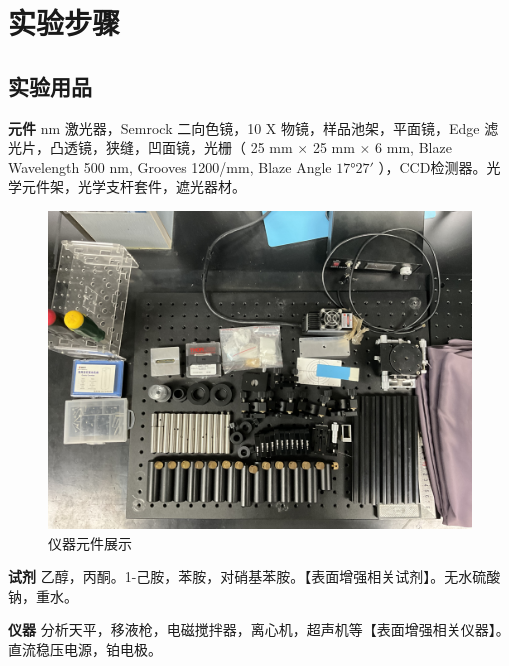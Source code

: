 \documentclass[UTF8]{article}
\begin{document}
	
	
	\section{实验步骤}	
	\subsection{实验用品}
	\textbf{元件}  nm 激光器，Semrock 二向色镜，10 X 物镜，样品池架，平面镜，Edge 滤光片，凸透镜，狭缝，凹面镜，光栅（ 25 mm $\times$ 25 mm $\times$ 6 mm, Blaze Wavelength 500 nm, Grooves 1200/mm, Blaze Angle  $17°27'$ ），CCD检测器。光学元件架，光学支杆套件，遮光器材。

	\begin{figure}[htp]
		\centering
		\includegraphics[width=0.5\linewidth]{figures/IMG_0014.JPG}
		\caption{仪器元件展示} \label{}
	\end{figure}
	
	\textbf{试剂} \quad 乙醇，丙酮。1-己胺，苯胺，对硝基苯胺。【表面增强相关试剂】。无水硫酸钠，重水。
	
	\textbf{仪器} \quad 分析天平，移液枪，电磁搅拌器，离心机，超声机等【表面增强相关仪器】。直流稳压电源，铂电极。
\end{document}
